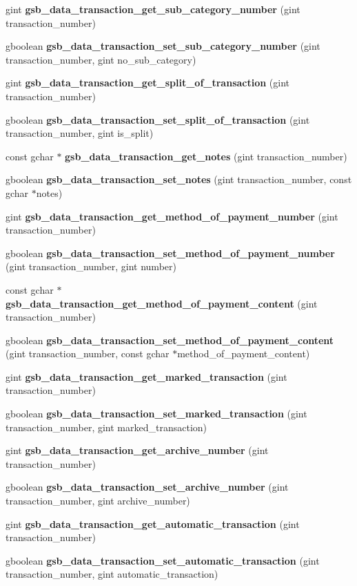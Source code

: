 \begin{DoxyCompactItemize}
gint {\bf gsb\_\-data\_\-transaction\_\-get\_\-sub\_\-category\_\-number} (gint transaction\_\-number)
\item 
gboolean {\bf gsb\_\-data\_\-transaction\_\-set\_\-sub\_\-category\_\-number} (gint transaction\_\-number, gint no\_\-sub\_\-category)
\item 
gint {\bf gsb\_\-data\_\-transaction\_\-get\_\-split\_\-of\_\-transaction} (gint transaction\_\-number)
\item 
gboolean {\bf gsb\_\-data\_\-transaction\_\-set\_\-split\_\-of\_\-transaction} (gint transaction\_\-number, gint is\_\-split)
\item 
const gchar $\ast$ {\bf gsb\_\-data\_\-transaction\_\-get\_\-notes} (gint transaction\_\-number)
\item 
gboolean {\bf gsb\_\-data\_\-transaction\_\-set\_\-notes} (gint transaction\_\-number, const gchar $\ast$notes)
\item 
gint {\bf gsb\_\-data\_\-transaction\_\-get\_\-method\_\-of\_\-payment\_\-number} (gint transaction\_\-number)
\item 
gboolean {\bf gsb\_\-data\_\-transaction\_\-set\_\-method\_\-of\_\-payment\_\-number} (gint transaction\_\-number, gint number)
\item 
const gchar $\ast$ {\bf gsb\_\-data\_\-transaction\_\-get\_\-method\_\-of\_\-payment\_\-content} (gint transaction\_\-number)
\item 
gboolean {\bf gsb\_\-data\_\-transaction\_\-set\_\-method\_\-of\_\-payment\_\-content} (gint transaction\_\-number, const gchar $\ast$method\_\-of\_\-payment\_\-content)
\item 
gint {\bf gsb\_\-data\_\-transaction\_\-get\_\-marked\_\-transaction} (gint transaction\_\-number)
\item 
gboolean {\bf gsb\_\-data\_\-transaction\_\-set\_\-marked\_\-transaction} (gint transaction\_\-number, gint marked\_\-transaction)
\item 
gint {\bf gsb\_\-data\_\-transaction\_\-get\_\-archive\_\-number} (gint transaction\_\-number)
\item 
gboolean {\bf gsb\_\-data\_\-transaction\_\-set\_\-archive\_\-number} (gint transaction\_\-number, gint archive\_\-number)
\item 
gint {\bf gsb\_\-data\_\-transaction\_\-get\_\-automatic\_\-transaction} (gint transaction\_\-number)
\item 
gboolean {\bf gsb\_\-data\_\-transaction\_\-set\_\-automatic\_\-transaction} (gint transaction\_\-number, gint automatic\_\-transaction)

\end{DoxyCompactItemize}
